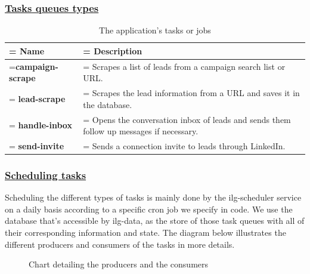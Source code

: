 \subsubsection*{\underline{Tasks queues types}}
\begin{table}[H]
	\renewcommand{\arraystretch}{1.5}%
	\caption{The application's tasks or jobs}
	\centering
	\medskip
	\begin{tabularx}{1\textwidth} {
			| >{\hsize=0.7\hsize\linewidth=\hsize\centering\arraybackslash}X
			| >{\hsize=1.3\hsize\linewidth=\hsize\justifying\arraybackslash}X |}
		\hline
		\rowcolor{primary} \textbf{Name} & \noindent \textbf{Description}                                                                  \\
		\hline
		\textbf {campaign-scrape}        & \noindent Scrapes a list of leads from a campaign search list or URL.                           \\
		\hline
		\textbf {lead-scrape}            & \noindent Scrapes the lead information from a URL and saves it in the database.                 \\
		\hline
		\textbf {handle-inbox}           & \noindent Opens the conversation inbox of leads and sends them follow up messages if necessary. \\
		\hline
		\textbf {send-invite}            & \noindent Sends a connection invite to leads through LinkedIn.                                  \\
		\hline
	\end{tabularx}
\end{table}

\subsubsection*{\underline{Scheduling tasks}}
Scheduling the different types of tasks is mainly done by the ilg-scheduler service on a daily basis according to a specific cron job we specify in code.
We use the database that's accessible by ilg-data, as the store of those task queues with all of their corresponding information and state.
The diagram below illustrates the different producers and consumers of the tasks in more details.
\begin{figure}[H]
	\centering
	\caption{Chart detailing the producers and the consumers}
	\label{fig:producer-consumer-diagram}
\end{figure}

